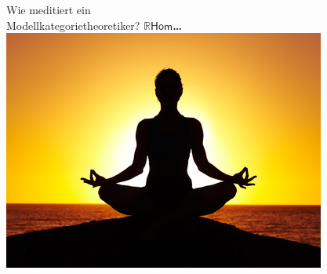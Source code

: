 \documentclass[a4paper,ngerman,landscape,30pt]{scrartcl}
\begin{document}
\begin{center}
  \huge\sffamily
  Wie meditiert ein \\ Modellkategorietheoretiker?
  \textbf{\phantom{\ldots}$\mathbb{R}\boldsymbol{\mathsf{Hom}}$\ldots}
  \vfill
  \includegraphics[scale=0.7]{images/meditation}
\end{center}
\newpage

\end{document}
